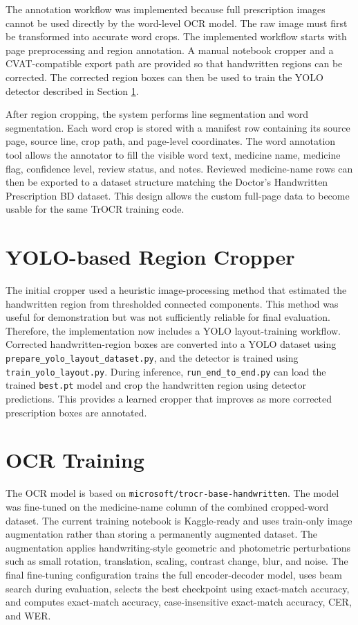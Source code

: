 \documentclass[modernstyle,12pt]{thesis}
\begin{document}
The annotation workflow was implemented because full prescription images cannot be used directly by the word-level OCR model. The raw image must first be transformed into accurate word crops. The implemented workflow starts with page preprocessing and region annotation. A manual notebook cropper and a CVAT-compatible export path are provided so that handwritten regions can be corrected. The corrected region boxes can then be used to train the YOLO detector described in Section \ref{sec:yolo-layout}.

After region cropping, the system performs line segmentation and word segmentation. Each word crop is stored with a manifest row containing its source page, source line, crop path, and page-level coordinates. The word annotation tool allows the annotator to fill the visible word text, medicine name, medicine flag, confidence level, review status, and notes. Reviewed medicine-name rows can then be exported to a dataset structure matching the Doctor's Handwritten Prescription BD dataset. This design allows the custom full-page data to become usable for the same TrOCR training code.

\section{YOLO-based Region Cropper}
\label{sec:yolo-layout}

The initial cropper used a heuristic image-processing method that estimated the handwritten region from thresholded connected components. This method was useful for demonstration but was not sufficiently reliable for final evaluation. Therefore, the implementation now includes a YOLO layout-training workflow. Corrected handwritten-region boxes are converted into a YOLO dataset using \texttt{prepare\_yolo\_layout\_dataset.py}, and the detector is trained using \texttt{train\_yolo\_layout.py}. During inference, \texttt{run\_end\_to\_end.py} can load the trained \texttt{best.pt} model and crop the handwritten region using detector predictions. This provides a learned cropper that improves as more corrected prescription boxes are annotated.

\section{OCR Training}

The OCR model is based on \texttt{microsoft/trocr-base-handwritten}. The model was fine-tuned on the medicine-name column of the combined cropped-word dataset. The current training notebook is Kaggle-ready and uses train-only image augmentation rather than storing a permanently augmented dataset. The augmentation applies handwriting-style geometric and photometric perturbations such as small rotation, translation, scaling, contrast change, blur, and noise. The final fine-tuning configuration trains the full encoder-decoder model, uses beam search during evaluation, selects the best checkpoint using exact-match accuracy, and computes exact-match accuracy, case-insensitive exact-match accuracy, CER, and WER.
\end{document}

